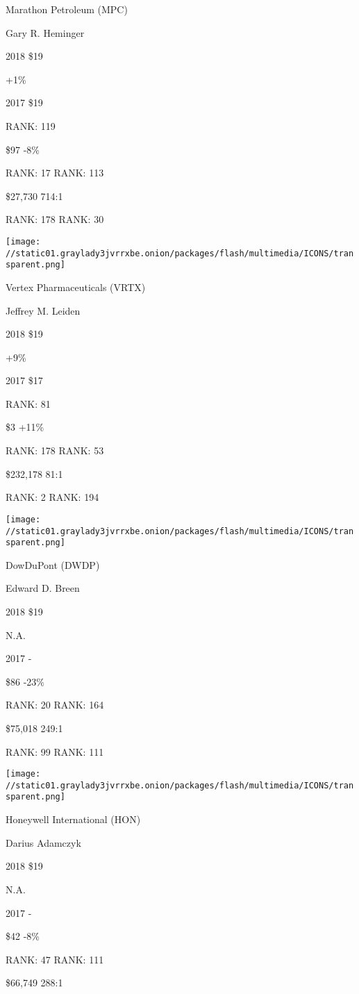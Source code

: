Marathon Petroleum (MPC)

Gary R. Heminger \protect\hyperlink{g-footnotes}{}

2018 \$19

 +1\%

2017 \$19

RANK: 119

 \$97 -8\%

RANK: 17 RANK: 113

 \$27,730 714:1

RANK: 178 RANK: 30

\texttt{[image: //static01.graylady3jvrrxbe.onion/packages/flash/multimedia/ICONS/transparent.png]}

Vertex Pharmaceuticals (VRTX)

Jeffrey M. Leiden \protect\hyperlink{g-footnotes}{}

2018 \$19

 +9\%

2017 \$17

RANK: 81

 \$3 +11\%

RANK: 178 RANK: 53

 \$232,178 81:1

RANK: 2 RANK: 194

\texttt{[image: //static01.graylady3jvrrxbe.onion/packages/flash/multimedia/ICONS/transparent.png]}

DowDuPont (DWDP)

Edward D. Breen \protect\hyperlink{g-footnotes}{}

2018 \$19

 N.A.

2017 -

 \$86 -23\%

RANK: 20 RANK: 164

 \$75,018 249:1

RANK: 99 RANK: 111

\texttt{[image: //static01.graylady3jvrrxbe.onion/packages/flash/multimedia/ICONS/transparent.png]}

Honeywell International (HON)

Darius Adamczyk \protect\hyperlink{g-footnotes}{}

2018 \$19

 N.A.

2017 -

 \$42 -8\%

RANK: 47 RANK: 111

 \$66,749 288:1

